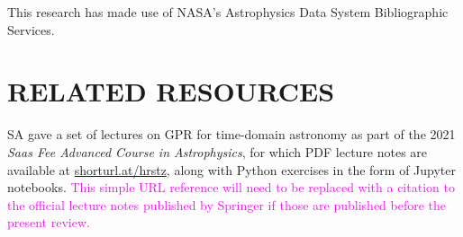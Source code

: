 \documentclass[letterpaper]{ar-1col}
\newcommand{\suz}[1]{\textcolor{magenta}{#1}}
\begin{document}
This research has made use of NASA's Astrophysics Data System Bibliographic Services.

%




\section*{RELATED RESOURCES}

SA gave a set of lectures on GPR for time-domain astronomy as part of the 2021 \emph{Saas Fee Advanced Course in Astrophysics}, for which PDF lecture notes are available at \url{shorturl.at/hrstz}, along with {\sc Python} exercises in the form of {\sc Jupyter} notebooks. \suz{This simple URL reference will need to be replaced with a citation to the official lecture notes published by Springer if those are published before the present review.}
\end{document}
